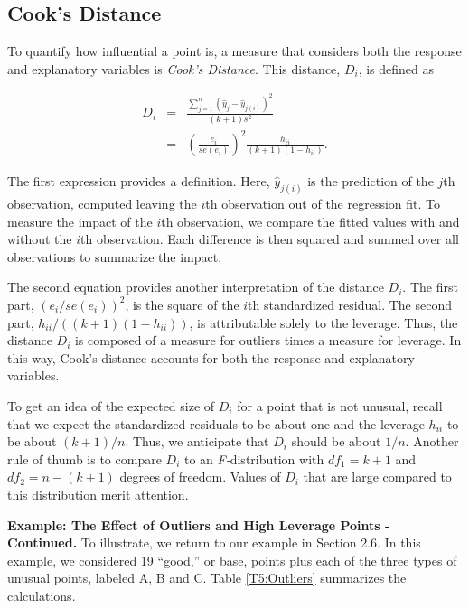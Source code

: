 \subsection{Cook's Distance}

To quantify how influential a point is, a measure that considers
both the response and explanatory variables is \textit{Cook's
Distance}. This distance, $D_i$, is defined as

\begin{eqnarray}\label{E5:CooksD}
D_i &=&\frac{\sum_{j=1}^{n}(\hat{y}_j-\hat{y}_{j(i)})^2}{(k+1)s^2} \\
&=&\left(\frac{e_i}{se(e_i)}\right)^2\frac{h_{ii}}{(k+1)(1-h_{ii})}.
\nonumber
\end{eqnarray}

\noindent The first expression provides a definition. Here,
$\hat{y}_{j(i)}$ is the prediction of the $j$th observation,
computed leaving the $i$th observation out of the regression fit. To
measure the impact of the $i$th observation, we compare the fitted
values with and without the $i$th observation. Each difference is
then squared and summed over all observations to summarize the
impact.

The second equation provides another interpretation of the distance
$D_i$. The first part, $(e_i/se(e_i))^2$, is the square of the $i$th
standardized residual. The second part, $h_{ii}/((k+1)(1-h_{ii}))$,
is attributable solely to the leverage. Thus, the distance $D_i$ is
composed of a measure for outliers times a measure for leverage. In
this way, Cook's distance accounts for both the response and
explanatory variables.

To get an idea of the expected size of $D_i$ for a point that is not
unusual, recall that we expect the standardized residuals to be
about one
and the leverage $h_{ii}$ to be about $(k+1)/n$. Thus, we anticipate that $%
D_i$ should be about $1/n$. Another rule of thumb is to compare
$D_i$ to an \textit{F-}distribution with $df_1=k+1$ and
$df_2=n-(k+1)$ degrees of freedom. Values of $D_i$ that are large
compared to this distribution merit attention.

\linejed

 \textbf{Example: The Effect of Outliers and High
Leverage Points - Continued.} To illustrate, we return to our
example in Section 2.6. In this example, we considered 19 ``good,''
or base, points plus each of the three types of unusual points,
labeled A, B and C. Table \ref{T5:Outliers} summarizes the
calculations.

